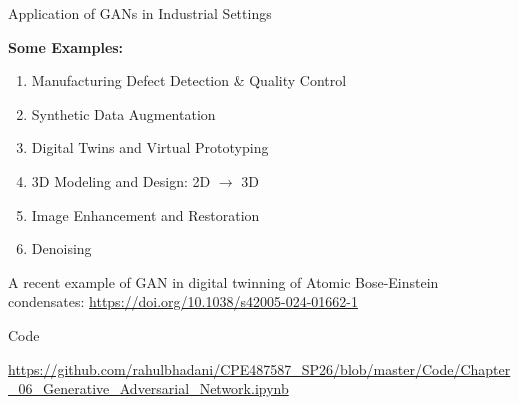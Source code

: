 \documentclass[aspectratio=169,xcolor=dvipsnames,svgnames,x11names,fleqn]{beamer}
\begin{document}
\begin{frame}{Application of GANs in Industrial Settings}

\textbf{Some Examples:}

\begin{enumerate}
\item Manufacturing Defect Detection \& Quality Control
\item Synthetic Data Augmentation
\item Digital Twins and Virtual Prototyping
\item 3D Modeling and Design: 2D $\to$ 3D
\item Image Enhancement and Restoration
\item Denoising
\end{enumerate}

A recent example of GAN in digital twinning of Atomic Bose-Einstein condensates: \url{https://doi.org/10.1038/s42005-024-01662-1}

\end{frame}


\begin{frame}{Code}

\LARGE

\centering

\url{https://github.com/rahulbhadani/CPE487587_SP26/blob/master/Code/Chapter_06_Generative_Adversarial_Network.ipynb}

\end{frame}
\end{document}
